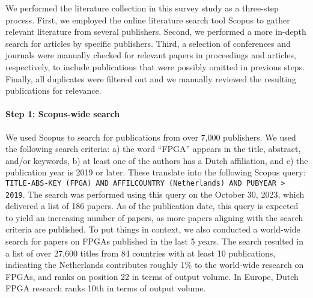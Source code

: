 
\label{select-lit-section}
We performed the literature collection in this survey study as a three-step process. First, we employed the online literature search tool Scopus \cite{elsevierScopus} to gather relevant literature from several publishers. Second, we performed a more in-depth search for articles by specific publishers. Third, a selection of conferences and journals were manually checked for relevant papers in proceedings and articles, respectively, to include publications that were possibly omitted in previous steps.  Finally, all duplicates were filtered out and we manually reviewed the resulting publications for relevance.

\paragraph{Step 1: Scopus-wide search}
We used Scopus to search for publications from over 7,000 publishers. We used the following search criteria: a) the word ``FPGA'' appears in the title, abstract, and/or keywords, b) at least one of the authors has a Dutch affiliation, and c) the publication year is 2019 or later. These translate into the following Scopus query:  
\texttt{TITLE-ABS-KEY (FPGA) AND AFFILCOUNTRY (Netherlands) AND PUBYEAR > 2019}.
The search was performed using this query on the October 30, 2023, which delivered a list of 186 papers. As of the publication date, this query is expected to yield an increasing number of papers, as more papers aligning with the search criteria are published. %
To put things in context, we also conducted a world-wide search for papers on FPGAs published in the last 5 years. The search resulted in a list of over 27,600 titles from 84 countries with at least 10 publications, indicating the Netherlands contributes roughly 1\% to the world-wide research on FPGAs, and ranks on position 22 in terms of output volume. In Europe, Dutch FPGA research ranks 10th in terms of output volume. 


